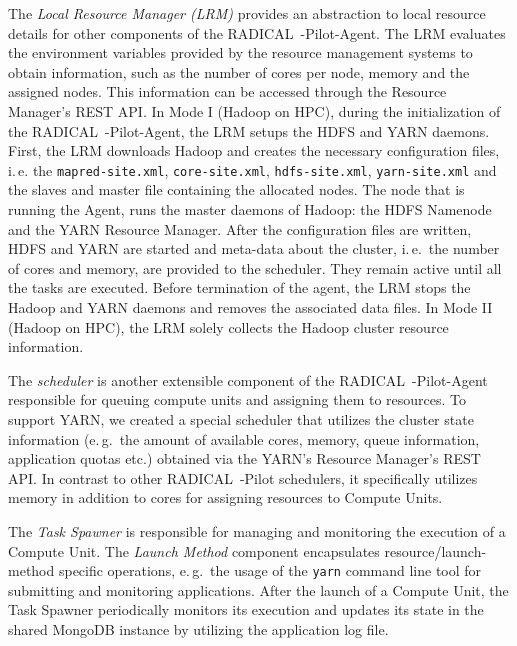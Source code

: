 The \emph{Local Resource Manager (LRM)} provides an abstraction to local resource details for other components of the RADICAL~-Pilot-Agent.
The LRM evaluates the environment variables provided by the resource management systems to obtain information, such as the number of cores per node, memory and the assigned nodes.
This information can be accessed through the Resource Manager's REST API.
In Mode I (Hadoop on HPC), during the initialization of the RADICAL~-Pilot-Agent, the LRM setups the HDFS and YARN daemons.
First, the LRM downloads Hadoop and creates the necessary configuration files, i.\,e. the \texttt{mapred-site.xml}, \texttt{core-site.xml}, \texttt{hdfs-site.xml}, \texttt{yarn-site.xml} and the slaves and master file containing the allocated nodes.
The node that is running the Agent, runs the master daemons of Hadoop: the HDFS Namenode and the YARN Resource Manager.
After the configuration files are written, HDFS and YARN are started and meta-data about the cluster, i.\,e.\ the number of cores and memory, are provided to the scheduler.
They remain active until all the tasks are executed.
Before termination of the agent, the LRM stops the Hadoop and YARN daemons and removes the associated data files.
In Mode II (Hadoop on HPC), the LRM solely collects the Hadoop cluster resource information.

The \emph{scheduler} is another extensible component of the RADICAL~-Pilot-Agent responsible for queuing compute units and assigning them to resources.
To support YARN, we created a special scheduler that utilizes the cluster state information (e.\,g.\ the amount of available cores, memory, queue information, application quotas etc.) obtained via the YARN's Resource Manager's REST API.
In contrast to other RADICAL~-Pilot schedulers, it specifically utilizes memory in addition to cores for assigning resources to Compute Units.

The \emph{Task Spawner} is responsible for managing and monitoring the execution of a Compute Unit.
The \emph{Launch Method} component encapsulates resource/launch-method specific operations, e.\,g.\ the usage of the \texttt{yarn} command line tool for submitting and monitoring applications.
After the launch of a Compute Unit, the Task Spawner periodically monitors its execution and updates its state in the shared MongoDB instance by utilizing the application log file.

